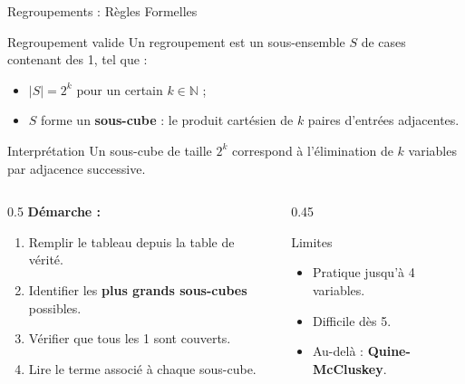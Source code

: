 \begin{frame}{Regroupements : Règles Formelles}

    \begin{block}{Regroupement valide}
        Un regroupement est un sous-ensemble \(S\) de cases contenant des 1, tel que :
        \begin{itemize}
            \item \(|S| = 2^k\) pour un certain \(k \in \mathbb{N}\) ;
            \item \(S\) forme un \textbf{sous-cube} : le produit cartésien de \(k\) paires d'entrées adjacentes.
        \end{itemize}
    \end{block}

    \vspace{0.3cm}

    \begin{alertblock}{Interprétation}
        Un sous-cube de taille \(2^k\) correspond à l'élimination de \(k\) variables par adjacence successive.
    \end{alertblock}

    \vspace{0.3cm}

    \begin{columns}[T]
        \begin{column}{0.5\textwidth}
            \textbf{Démarche :}
            \begin{enumerate}
                \item Remplir le tableau depuis la table de vérité.
                \item Identifier les \textbf{plus grands sous-cubes} possibles.
                \item Vérifier que tous les 1 sont couverts.
                \item Lire le terme associé à chaque sous-cube.
            \end{enumerate}
        \end{column}
        \begin{column}{0.45\textwidth}
            \begin{exampleblock}{Limites}
                \begin{itemize}
                    \item Pratique jusqu'à 4 variables.
                    \item Difficile dès 5.
                    \item Au-delà : \textbf{Quine-McCluskey}.
                \end{itemize}
            \end{exampleblock}
        \end{column}
    \end{columns}

\end{frame}
